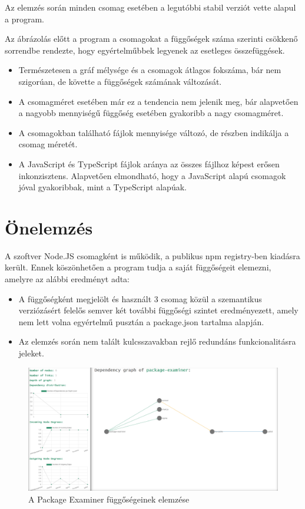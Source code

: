 \pagebreak

Az elemzés során minden csomag esetében a legutóbbi stabil verziót vette alapul a program. 

Az ábrázolás előtt a program a csomagokat a függőségek száma szerinti csökkenő sorrendbe rendezte, hogy egyértelműbbek legyenek az esetleges összefüggések.

\begin{itemize}
	\item Természetesen a gráf mélysége és a csomagok átlagos fokszáma, bár nem szigorúan, de követte a függőségek számának változását.
	\item A csomagméret esetében már ez a tendencia nem jelenik meg, bár alapvetően a nagyobb mennyiségű függőség esetében gyakoribb a nagy csomagméret.
	\item A csomagokban található fájlok mennyisége változó, de részben indikálja a csomag méretét.
	\item A JavaScript és TypeScript fájlok aránya az összes fájlhoz képest erősen inkonzisztens. Alapvetően elmondható, hogy a JavaScript alapú csomagok jóval gyakoribbak, mint a TypeScript alapúak.
\end{itemize}

\section{Önelemzés}

A szoftver Node.JS csomagként is működik, a publikus npm registry-ben kiadásra került. Ennek köszönhetően a program tudja a saját függőségeit elemezni, amelyre az alábbi eredményt adta:

\begin{itemize}
	\item A függőségként megjelölt és használt 3 csomag közül a szemantikus verziózásért felelős semver két további függőségi szintet eredményezett, amely nem lett volna egyértelmű pusztán a package.json tartalma alapján.
	\item Az elemzés során nem talált kulcsszavakban rejlő redundáns funkcionalitásra jeleket.
\end{itemize}

\begin{figure}[!h]
	\centering
	\includegraphics[scale=0.3]{images/package-examiner.png}
	\caption{A Package Examiner függőségeinek elemzése}
	\label{fig:package-examiner}
\end{figure}